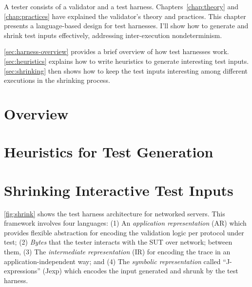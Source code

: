 A tester consists of a validator and a test harness.  Chapters~\ref{chap:theory}
and \ref{chap:practices} have explained the validator's theory and practices.
This chapter presents a language-based design for test harnesses.  I'll show how
to generate and shrink test inputs effectively, addressing inter-execution
nondeterminism.

\autoref{sec:harness-overview} provides a brief overview of how test harnesses
work.  \autoref{sec:heuristics} explains how to write heuristics to generate
interesting test inputs.  \autoref{sec:shrinking} then shows how to keep the
test inputs interesting among different executions in the shrinking process.

\section{Overview}
\label{sec:harness-overview}


\section{Heuristics for Test Generation}
\label{sec:heuristics}



\section{Shrinking Interactive Test Inputs}
\label{sec:shrinking}

\autoref{fig:shrink} shows the test harness architecture for networked
servers.  This framework involves four languages: (1) An {\em
  application representation} (AR) which provides flexible abstraction
for encoding the validation logic per protocol under test; (2) {\em
  Bytes} that the tester interacts with the SUT over network; between
them, (3) The {\em intermediate representation} (IR) for encoding the
trace in an application-independent way; and (4) The {\em symbolic
  representation} called ``J-expressions'' (Jexp) which encodes the
input generated and shrunk by the test harness.


